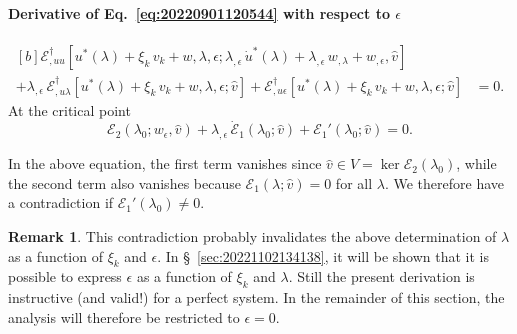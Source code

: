 \documentclass[12pt, final]{scrartcl}
\theoremstyle{definition}
\newtheorem{remark}{Remark}
\newcommand{\E}{\mathcal E}
\newcommand{\EE}{\mathcal E ^ \dagger}
\begin{document}
\paragraph{Derivative of Eq.~\eqref{eq:20220901120544} with respect to \(\epsilon\)}
\begin{equation}
  \begin{aligned}[b]
    \EE_{,uu}[u^\ast(\lambda) + \xi_k \, v_k + w, \lambda, \epsilon; \lambda_{,\epsilon} \, \dot{u}^\ast(\lambda) + \lambda_{,\epsilon} \, w_{,\lambda} + w_{,\epsilon}, \hat{v}] &\\
    + \lambda_{,\epsilon} \, \EE_{,u\lambda}[u^\ast(\lambda) + \xi_k \, v_k + w, \lambda, \epsilon; \hat{v}] + \EE_{,u\epsilon}[u^\ast(\lambda) + \xi_k \, v_k + w, \lambda, \epsilon; \hat{v}] &= 0.
  \end{aligned}
\end{equation}
At the critical point
\begin{equation}
  \E_2(\lambda_0; w_\epsilon, \hat{v}) + \lambda_{,\epsilon} \, \dot{\E}_1(\lambda_0; \hat{v}) + \E_1'(\lambda_0; \hat{v}) = 0.
\end{equation}

In the above equation, the first term vanishes since \(\hat{v} \in V = \ker \E_2(\lambda_0)\), while the second term also
vanishes because \(\E_1(\lambda; \hat{v}) = 0\) for all \(\lambda\). We therefore have a contradiction if \(\E_1'(\lambda_0) \neq 0\).

\begin{remark}
  This contradiction probably invalidates the above determination of \(\lambda\) as a function of \(\xi_k\) and
  \(\epsilon\). In \S~\ref{sec:20221102134138}, it will be shown that it is possible to express \(\epsilon\) as a function of
  \(\xi_k\) and \(\lambda\). Still the present derivation is instructive (and valid!) for a perfect system. In the remainder of
  this section, the analysis will therefore be restricted to \(\epsilon=0\).
\end{remark}
\end{document}
